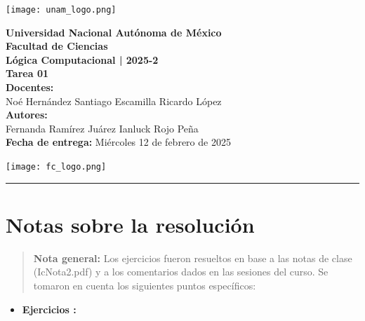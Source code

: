 \documentclass[12pt,letterpaper]{article}
\begin{document}
\begin{center}
  \begin{minipage}{3cm}
    \begin{center}
      \texttt{[image: unam\_logo.png]}
    \end{center}
  \end{minipage}\hfill
  \begin{minipage}{10cm}
    \begin{center}
      \textbf{\Large Universidad Nacional Autónoma de México}\\[0.2cm]
      \textbf{\large Facultad de Ciencias}\\[0.2cm]
      \textbf{Lógica Computacional | 2025-2}\\[0.4cm]
      \textbf{\Large Tarea 01}\\[0.1cm]
      \textbf{Docentes:}\\
      Noé Hernández \hspace{1em} Santiago Escamilla \hspace{1em} Ricardo López\\[0.3cm]
      \textbf{Autores:}\\
      Fernanda Ramírez Juárez \quad Ianluck Rojo Peña\\[0.3cm]
      \textbf{Fecha de entrega:} Miércoles 12 de febrero de 2025
    \end{center}
  \end{minipage}\hfill
  \begin{minipage}{3cm}
    \begin{center}
      \texttt{[image: fc\_logo.png]}
    \end{center}
  \end{minipage}
\end{center}

\bigskip
\hrule height 0.1pt
\bigskip

\section*{Notas sobre la resolución}

\begin{quote}
  \textbf{Nota general:}  
  Los ejercicios fueron resueltos en base a las notas de clase (IcNota2.pdf) y a los comentarios dados en las sesiones del curso. Se tomaron en cuenta los siguientes puntos específicos:  
\end{quote}

\begin{itemize}
   \item \textbf{Ejercicios :}
\end{itemize}
\end{document}
